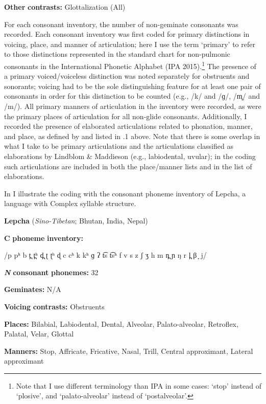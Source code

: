 \textbf{Other} \textbf{contrasts:} Glottalization (All)
\z

  For each consonant inventory, the number of non-geminate consonants was recorded. Each consonant inventory was first coded for primary distinctions in voicing, place, and manner of articulation; here I use the term ‘primary’ to refer to those distinctions represented in the standard chart for non-pulmonic consonants in the International Phonetic Alphabet (IPA 2015).\footnote{ \textrm{Note that I use different terminology than IPA in some cases: ‘stop’ instead of ‘plosive’, and ‘palato-alveolar’ instead of ‘postalveolar’.}} The presence of a primary voiced/voiceless distinction was noted separately for obstruents and sonorants; voicing had to be the sole distinguishing feature for at least one pair of consonants in order for this distinction to be counted (e.g., /k/ and /ɡ/, /m̥/ and /m/). All primary manners of articulation in the inventory were recorded, as were the primary places of articulation for all non-glide consonants. Additionally, I recorded the presence of elaborated articulations related to phonation, manner, and place, as defined by \citet{LindblomMaddieson1988} and listed in .1 above. Note that there is some overlap in what I take to be primary articulations and the articulations classified as elaborations by Lindblom \& Maddieson (e.g., labiodental, uvular); in the coding such articulations are included in both the place/manner lists and in the list of elaborations.

  In  I illustrate the coding with the consonant phoneme inventory of Lepcha, a language with Complex syllable structure.

\ea\label{ex:(4.10)}
  \textbf{Lepcha} (\textit{Sino-Tibetan}; Bhutan, India, Nepal)

\textbf{C} \textbf{phoneme} \textbf{inventory:} 

/p pʰ b t̪ t̪ʰ d̪ ʈ ʈʰ ɖ c cʰ k kʰ ɡ ʔ t͡s t͡sʰ f v s z ʃ ʒ h m n̪ ɲ ŋ r l̪ β ̞ j/

\textbf{\textit{N}} \textbf{consonant} \textbf{phonemes:} 32

\textbf{Geminates:} N/A

\textbf{Voicing} \textbf{contrasts:} Obstruents

\textbf{Places:} Bilabial, Labiodental, Dental, Alveolar, Palato-alveolar, Retroflex, Palatal, Velar, Glottal

\textbf{Manners:} Stop, Affricate, Fricative, Nasal, Trill, Central approximant, Lateral approximant

